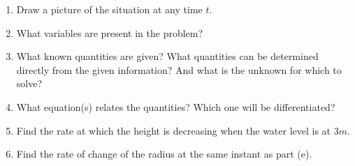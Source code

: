 \begin{enumerate}[label=\hspace{11pt}(\alph*), align=left, leftmargin=*, labelsep=0.25em]
    \item Draw a picture of the situation at any time $t$.
    \item What variables are present in the problem?
    \item What known quantities are given? What quantities can be determined directly from the given information? And what is the unknown for which to solve?
    \item What equation(s) relates the quantities? Which one will be differentiated?
    \item Find the rate at which the height is decreasing when the water level is at $3 \si{m}$.
    \item Find the rate of change of the radius at the same instant as part (e).
\end{enumerate} \vspace{11pt}

